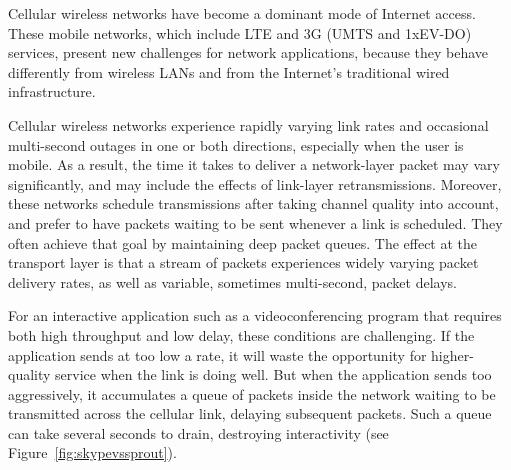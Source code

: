 \label{sprout:intro}

Cellular wireless networks have become a dominant mode of Internet
access. These mobile networks, which include LTE and 3G (UMTS and
1xEV-DO) services, present new challenges for network applications,
because they behave differently from wireless LANs and from the
Internet's traditional wired infrastructure.

Cellular wireless networks experience rapidly varying link rates
and occasional multi-second outages in one or both directions,
especially when the user is mobile. As a result, the time it takes to
deliver a network-layer packet may vary significantly, and may include
the effects of link-layer retransmissions. Moreover, these networks
schedule transmissions after taking channel quality into account, and
prefer to have packets waiting to be sent whenever a link is
scheduled. They often achieve that goal by maintaining deep packet
queues. The effect at the transport layer is that a stream of packets
experiences widely varying packet delivery rates, as well as variable,
sometimes multi-second, packet delays.



For an interactive application such as a videoconferencing program
that requires both high throughput and low delay, these conditions are
challenging. If the application sends at too low a rate, it will waste
the opportunity for higher-quality service when the link is
doing well. But when the application sends too aggressively, it
accumulates a queue of packets inside the network waiting to be
transmitted across the cellular link, delaying subsequent
packets. Such a queue can take several seconds to drain, destroying
interactivity (see Figure~\ref{fig:skypevssprout}).


